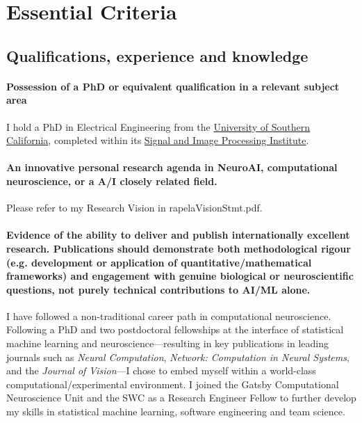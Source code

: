 \documentclass{article}
\begin{document}
\section*{Essential Criteria}

\subsection*{Qualiﬁcations, experience and knowledge}

\paragraph{Possession of a PhD or equivalent qualiﬁcation in a relevant subject
area}
%
I hold a PhD in Electrical Engineering from the
\href{https://www.usc.edu/}{University of Southern California}, completed
within its \href{https://minghsiehece.usc.edu/groups/sipi/}{Signal and Image
Processing Institute}.

\paragraph{An innovative personal research agenda in NeuroAI, computational
neuroscience, or a A/I closely related ﬁeld.}
%
Please refer to my Research Vision in rapelaVisionStmt.pdf.

\paragraph{Evidence of the ability to deliver and publish internationally
excellent research. Publications should demonstrate both methodological rigour
(e.g. development or application of quantitative/mathematical frameworks) and
engagement with genuine biological or neuroscientiﬁc questions, not purely
technical contributions to AI/ML alone.}
%
I have followed a non-traditional career path in computational neuroscience.
Following a PhD and two postdoctoral fellowships at the interface of
statistical machine learning and neuroscience—resulting in key publications in
leading journals such as \textit{Neural Computation}, \textit{Network:
Computation in Neural Systems}, and the \textit{Journal of Vision}—I chose to
embed myself within a world-class computational/experimental environment. I
joined the Gatsby Computational Neuroscience Unit and the SWC as a Research
Engineer Fellow to further develop my skills in statistical machine learning,
software engineering and team science.
\end{document}
